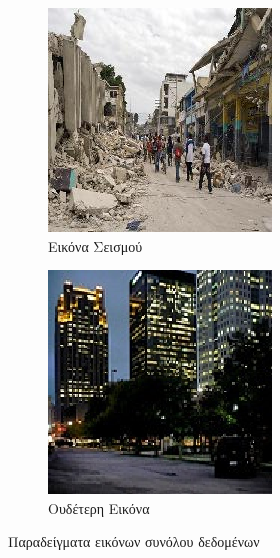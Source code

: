 \begin{figure}[h]
    \vspace{0.5cm} %

    \begin{subfigure}{0.45\textwidth}
        \centering
        \includegraphics[width=\linewidth]{figures/chapter2/earthquake.jpg}
        \caption{Εικόνα Σεισμού}
        \label{fig:image3}
    \end{subfigure}
    \begin{subfigure}{0.45\textwidth}
        \centering
        \includegraphics[width=\linewidth]{figures/chapter2/neutral.png}
        \caption{Ουδέτερη Εικόνα}
        \label{fig:image4}
    \end{subfigure}
    
    \caption{Παραδείγματα εικόνων συνόλου δεδομένων}
    \label{fig:four_images}
\end{figure}

